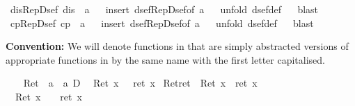 \begin{isabellebody}
\isamarkupfalse%
\isanewline
\isanewline
\isamarkupfalse%
\ dis{\isacharunderscore}Rep{\isacharunderscore}Dsef{\isacharcolon}\ {\isachardoublequote}dis\ {\isacharparenleft}{\isasymDown}\ a{\isacharparenright}{\isachardoublequote}\isanewline
\ \ \isamarkupfalse%
insert\ dsef{\isacharunderscore}Rep{\isacharunderscore}Dsef{\isacharbrackleft}of\ a{\isacharbrackright}{\isacharparenright}\isanewline
\ \ \isamarkupfalse%
unfold\ dsef{\isacharunderscore}def{\isacharparenright}\isanewline
\ \ \isamarkupfalse%
blast{\isacharparenright}\isanewline
\isamarkupfalse%
\isanewline
\isanewline
\isamarkupfalse%
\ cp{\isacharunderscore}Rep{\isacharunderscore}Dsef{\isacharcolon}\ {\isachardoublequote}cp\ {\isacharparenleft}{\isasymDown}\ a{\isacharparenright}{\isachardoublequote}\isanewline
\ \ \isamarkupfalse%
insert\ dsef{\isacharunderscore}Rep{\isacharunderscore}Dsef{\isacharbrackleft}of\ a{\isacharbrackright}{\isacharparenright}\isanewline
\ \ \isamarkupfalse%
unfold\ dsef{\isacharunderscore}def{\isacharparenright}\isanewline
\ \ \isamarkupfalse%
blast{\isacharparenright}\isanewline
\isamarkupfalse%
\isamarkupfalse%
%
\begin{isamarkuptext}%
\textbf{Convention:} We will denote functions in  that are simply
abstracted versions
  of appropriate functions in  by the same name with the first
  letter capitalised.%
\end{isamarkuptext}%
\isamarkuptrue%
\ \isanewline
\ \ Ret\ {\isacharcolon}{\isacharcolon}\ {\isachardoublequote}{\isacharprime}a\ {\isasymRightarrow}\ {\isacharprime}a\ D{\isachardoublequote}\isanewline
\ \ {\isachardoublequote}Ret\ x\ {\isasymequiv}\ {\isasymUp}\ {\isacharparenleft}ret\ x{\isacharparenright}{\isachardoublequote}\isanewline
\isanewline
\isanewline
\isamarkupfalse%
\ Ret{\isacharunderscore}ret{\isacharcolon}\ {\isachardoublequote}{\isasymDown}\ {\isacharparenleft}Ret\ x{\isacharparenright}\ {\isacharequal}\ ret\ x{\isachardoublequote}\isanewline
\isamarkupfalse%
\ {\isacharminus}\isanewline
\ \ \isamarkupfalse%
\ {\isachardoublequote}{\isasymDown}\ {\isacharparenleft}Ret\ x{\isacharparenright}\ {\isacharequal}\ {\isasymDown}\ {\isacharparenleft}{\isasymUp}\ {\isacharparenleft}ret\ x{\isacharparenright}{\isacharparenright}{\isachardoublequote}\ \isamarkupfalse%

\end{isabellebody}

